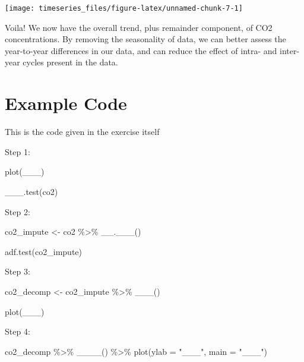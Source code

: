 \documentclass[
]{book}
\newenvironment{Shaded}{\begin{snugshade}}{\end{snugshade}}
\newcommand{\AttributeTok}[1]{\textcolor[rgb]{0.77,0.63,0.00}{#1}}
\newcommand{\FunctionTok}[1]{\textcolor[rgb]{0.00,0.00,0.00}{#1}}
\newcommand{\NormalTok}[1]{#1}
\newcommand{\OtherTok}[1]{\textcolor[rgb]{0.56,0.35,0.01}{#1}}
\newcommand{\SpecialCharTok}[1]{\textcolor[rgb]{0.00,0.00,0.00}{#1}}
\newcommand{\StringTok}[1]{\textcolor[rgb]{0.31,0.60,0.02}{#1}}
\begin{document}
\begin{center}\texttt{[image: timeseries\_files/figure-latex/unnamed-chunk-7-1]} \end{center}

Voila! We now have the overall trend, plus remainder component, of CO2 concentrations. By removing the seasonality of data, we can better assess the year-to-year differences in our data, and can reduce the effect of intra- and inter-year cycles present in the data.

\hypertarget{example-code}{%
\section{Example Code}\label{example-code}}

This is the code given in the exercise itself

Step 1:

\begin{Shaded}
\begin{Highlighting}[]
\FunctionTok{plot}\NormalTok{(\_\_\_)}

\FunctionTok{\_\_\_.test}\NormalTok{(co2)}
\end{Highlighting}
\end{Shaded}

Step 2:

\begin{Shaded}
\begin{Highlighting}[]
\NormalTok{co2\_impute }\OtherTok{\textless{}{-}}\NormalTok{ co2 }\SpecialCharTok{\%\textgreater{}\%} 
  \FunctionTok{\_\_.\_\_\_}\NormalTok{()}

\FunctionTok{adf.test}\NormalTok{(co2\_impute)}
\end{Highlighting}
\end{Shaded}

Step 3:

\begin{Shaded}
\begin{Highlighting}[]
\NormalTok{co2\_decomp }\OtherTok{\textless{}{-}}\NormalTok{ co2\_impute }\SpecialCharTok{\%\textgreater{}\%} 
  \FunctionTok{\_\_\_}\NormalTok{()}

\FunctionTok{plot}\NormalTok{(\_\_\_)}
\end{Highlighting}
\end{Shaded}

Step 4:

\begin{Shaded}
\begin{Highlighting}[]
\NormalTok{co2\_decomp }\SpecialCharTok{\%\textgreater{}\%} 
  \FunctionTok{\_\_\_\_}\NormalTok{() }\SpecialCharTok{\%\textgreater{}\%} 
  \FunctionTok{plot}\NormalTok{(}\AttributeTok{ylab =} \StringTok{"\_\_\_"}\NormalTok{, }\AttributeTok{main =} \StringTok{"\_\_\_"}\NormalTok{)}
\end{Highlighting}
\end{Shaded}
\end{document}
